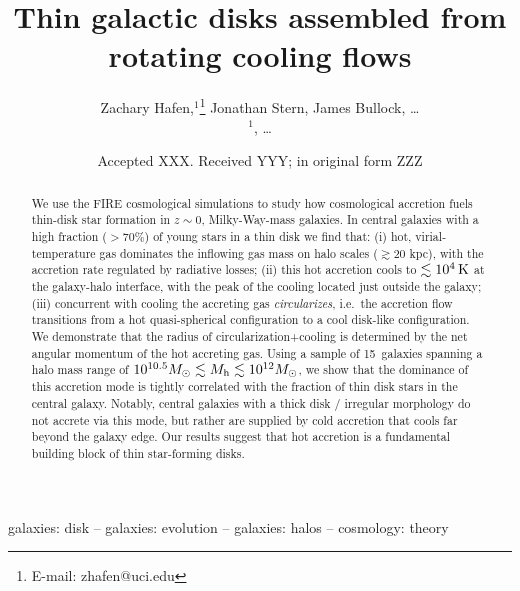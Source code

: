 \documentclass[fleqn,usenatbib]{mnras}
\title[Cooling flows and thin galactic disks]{Thin galactic disks assembled from rotating cooling flows}
\author[Hafen, Stern, Bullock et al.]{
Zachary Hafen,$^{1}$\thanks{E-mail: zhafen@uci.edu}
Jonathan Stern,
James Bullock,
\ldots
\\
$^1$,
\ldots
}
\date{Accepted XXX. Received YYY; in original form ZZZ}
\newcommand{\Rcon}{R_{T=10^5\,{\rm K}}}
\newcommand{\Nsample}{15}
\begin{document}
\label{firstpage}
\pagerange{\pageref{firstpage}--\pageref{lastpage}}
\maketitle

\begin{abstract}
We use the FIRE cosmological simulations to study how cosmological accretion fuels thin-disk star formation in $z\sim 0$, Milky-Way-mass galaxies.
In central galaxies with a high fraction ($>70\%$) of young stars in a thin disk we find that:
(i) hot, virial-temperature gas dominates the inflowing gas mass on halo scales ($\gtrsim 20$ kpc), with the accretion rate regulated by radiative losses;
(ii) this hot accretion cools to $\lesssim10^4\,{\rm K}$ at the galaxy-halo interface, with the peak of the cooling located just outside the galaxy;
(iii) concurrent with cooling the accreting gas \textit{circularizes}, i.e.\ the accretion flow transitions from a hot quasi-spherical configuration to a cool disk-like configuration.
We demonstrate that the radius of circularization+cooling is determined by the net angular momentum of the hot accreting gas.
Using a sample of \Nsample~galaxies spanning a halo mass range of $10^{10.5} M_\odot \lesssim M_{\rm h} \lesssim 10^{12} M_\odot$, we show that the dominance of this accretion mode is tightly correlated with the fraction of thin disk stars in the central galaxy.
Notably, central galaxies with a thick disk / irregular morphology do not accrete via this mode, but rather are supplied by cold accretion that cools far beyond the galaxy edge.
Our results suggest that hot accretion is a fundamental building block of thin star-forming disks.
\end{abstract}

\begin{keywords}
galaxies: disk -- galaxies: evolution -- galaxies: halos -- cosmology: theory
\end{keywords}



\end{document}
